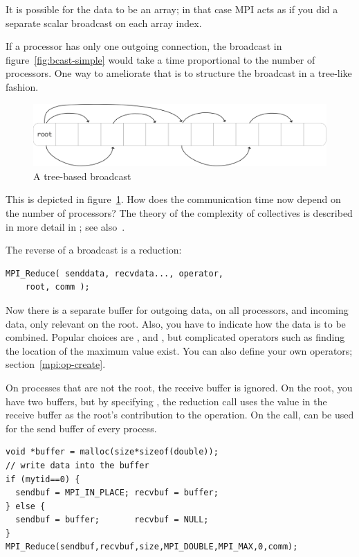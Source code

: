 It is possible for the data to be an array; in that case MPI acts as if you did a 
separate scalar broadcast on each array index.

If a processor has only one outgoing connection, the broadcast in
figure~\ref{fig:bcast-simple} would take a time proportional to the
number of processors. One way to ameliorate that is to structure the
broadcast in a tree-like fashion.
\begin{figure}[ht]
  \includegraphics[scale=.1]{graphics/bcast-tree}
  \caption{A tree-based broadcast}
  \label{fig:bcast-tree}
\end{figure}
This is depicted in figure~\ref{fig:bcast-tree}. How does the
communication time now depend on the number of processors? The theory
of the complexity of collectives is described in more detail in
; see also~\cite{Chan2007Collective}.

The reverse of a broadcast is a reduction:
\begin{verbatim}
MPI_Reduce( senddata, recvdata..., operator,
    root, comm ); 
\end{verbatim}
Now there is a separate buffer for outgoing data, on all processors,
and incoming data, only relevant on the root. Also, you have to
indicate how the data is to be combined. Popular choices are
,  and
, but complicated operators such as finding the
location of the maximum value exist. You can also define your own
operators; section~\ref{mpi:op-create}.

On processes that are not the root, the receive buffer is ignored. On the root, 
you have two buffers, but by specifying , the reduction call
uses the value in the receive buffer as the root's contribution to the operation.
On the  call,  can be used for the send buffer of
every process.

\begin{verbatim}
void *buffer = malloc(size*sizeof(double));
// write data into the buffer
if (mytid==0) {
  sendbuf = MPI_IN_PLACE; recvbuf = buffer;
} else {
  sendbuf = buffer;       recvbuf = NULL;
}
MPI_Reduce(sendbuf,recvbuf,size,MPI_DOUBLE,MPI_MAX,0,comm);
\end{verbatim}

